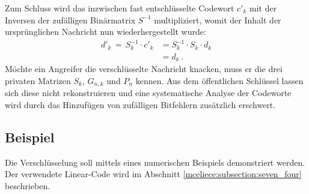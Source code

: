 Zum Schluss wird das inzwischen fast entschlüsselte Codewort $c'_k$ mit der Inversen der zufälligen Binärmatrix $S^{-1}$ multipliziert,
womit der Inhalt der ursprünglichen Nachricht nun wiederhergestellt wurde:
\begin{align*}
    d'_{k}\,=\,S_{k}^{-1} \cdot c'_k&=S_{k}^{-1} \cdot S_{k}\cdot d_k\\
                                    &=d_k\,.
\end{align*}
Möchte ein Angreifer die verschlüsselte Nachricht knacken, muss er die drei privaten Matrizen $S_k$, $G_{n,k}$ und $P_n$ kennen.
Aus dem öffentlichen Schlüssel lassen sich diese nicht rekonstruieren
und eine systematische Analyse der Codeworte wird durch das Hinzufügen von zufälligen Bitfehlern zusätzlich erschwert.

\subsection{Beispiel}
Die Verschlüsselung soll mittels eines numerischen Beispiels demonstriert werden. 
Der verwendete Linear-Code wird im Abschnitt \ref{mceliece:subsection:seven_four} beschrieben.
